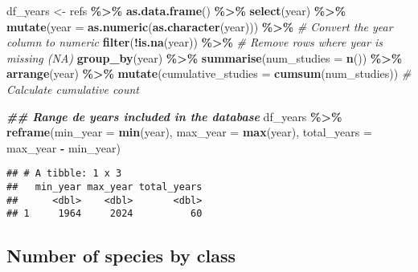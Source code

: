 \documentclass[
]{article}
\newenvironment{Shaded}{\begin{snugshade}}{\end{snugshade}}
\newcommand{\AttributeTok}[1]{\textcolor[rgb]{0.13,0.29,0.53}{#1}}
\newcommand{\CommentTok}[1]{\textcolor[rgb]{0.56,0.35,0.01}{\textit{#1}}}
\newcommand{\DocumentationTok}[1]{\textcolor[rgb]{0.56,0.35,0.01}{\textbf{\textit{#1}}}}
\newcommand{\FunctionTok}[1]{\textcolor[rgb]{0.13,0.29,0.53}{\textbf{#1}}}
\newcommand{\NormalTok}[1]{#1}
\newcommand{\OtherTok}[1]{\textcolor[rgb]{0.56,0.35,0.01}{#1}}
\newcommand{\SpecialCharTok}[1]{\textcolor[rgb]{0.81,0.36,0.00}{\textbf{#1}}}
\begin{document}
\begin{Shaded}
\begin{Highlighting}[]
\NormalTok{df\_years }\OtherTok{\textless{}{-}}\NormalTok{ refs }\SpecialCharTok{\%\textgreater{}\%} 
  \FunctionTok{as.data.frame}\NormalTok{() }\SpecialCharTok{\%\textgreater{}\%} 
  \FunctionTok{select}\NormalTok{(year) }\SpecialCharTok{\%\textgreater{}\%} 
  \FunctionTok{mutate}\NormalTok{(}\AttributeTok{year =} \FunctionTok{as.numeric}\NormalTok{(}\FunctionTok{as.character}\NormalTok{(year))) }\SpecialCharTok{\%\textgreater{}\%}  \CommentTok{\# Convert the \textquotesingle{}year\textquotesingle{} column to numeric}
  \FunctionTok{filter}\NormalTok{(}\SpecialCharTok{!}\FunctionTok{is.na}\NormalTok{(year)) }\SpecialCharTok{\%\textgreater{}\%}  \CommentTok{\# Remove rows where \textquotesingle{}year\textquotesingle{} is missing (NA)}
  \FunctionTok{group\_by}\NormalTok{(year) }\SpecialCharTok{\%\textgreater{}\%}
  \FunctionTok{summarise}\NormalTok{(}\AttributeTok{num\_studies =} \FunctionTok{n}\NormalTok{()) }\SpecialCharTok{\%\textgreater{}\%}
  \FunctionTok{arrange}\NormalTok{(year) }\SpecialCharTok{\%\textgreater{}\%}
  \FunctionTok{mutate}\NormalTok{(}\AttributeTok{cumulative\_studies =} \FunctionTok{cumsum}\NormalTok{(num\_studies))  }\CommentTok{\# Calculate cumulative count}

\DocumentationTok{\#\# Range de years included in the database}
\NormalTok{df\_years }\SpecialCharTok{\%\textgreater{}\%} 
  \FunctionTok{reframe}\NormalTok{(}\AttributeTok{min\_year =} \FunctionTok{min}\NormalTok{(year), }
          \AttributeTok{max\_year =} \FunctionTok{max}\NormalTok{(year), }
          \AttributeTok{total\_years =}\NormalTok{ max\_year }\SpecialCharTok{{-}}\NormalTok{ min\_year)}
\end{Highlighting}
\end{Shaded}

\begin{verbatim}
## # A tibble: 1 x 3
##   min_year max_year total_years
##      <dbl>    <dbl>       <dbl>
## 1     1964     2024          60
\end{verbatim}

\subsection{Number of species by class}\label{number-of-species-by-class}
\end{document}
